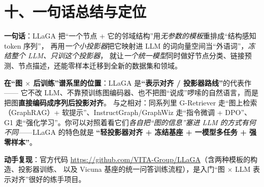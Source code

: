 \documentclass[11pt,UTF8,fontset=fandol]{ctexart}
\begin{document}
\section{十、一句话总结与定位}

\textbf{一句话}：LLaGA 把“一个节点 + 它的邻域结构”用\emph{无参数的模板}重排成“结构感知 token 序列”，
再用\emph{一个小投影器}把它映射进 LLM 的词向量空间当“外语词”，\emph{冻结整个 LLM、只训这个投影器}，
就让\emph{一个统一模型}同时做好节点分类、链接预测、节点描述，还能零样本迁移到全新的数据集和领域。

\textbf{在“图 $\times$ 后训练”谱系里的位置}：LLaGA 是\textbf{“表示对齐 / 投影器路线”}的代表作——
它不改 LLM、不靠预训练图编码器、也不把图“说成”啰嗦的自然语言，而是把图\textbf{直接编码成序列后投影对齐}。
与之相对：同系列里 G-Retriever 走“图上检索（GraphRAG）+ 软提示”、InstructGraph/GraphWiz 走“指令微调 + DPO”、
G1 走“强化学习”。你可以对照着看它们\emph{各自把“图的信息”塞进 LLM 的方式有何不同}——LLaGA 的特色就是
\textbf{“轻投影器对齐 + 冻结基座 + 一模型多任务 + 强零样本”}。

\textbf{动手复现}：官方代码 \url{https://github.com/VITA-Group/LLaGA}（含两种模板的构造、投影器训练、
以及 Vicuna 基座的统一问答训练流程），是入门“图 $\times$ LLM 表示对齐”很好的练手项目。
\end{document}
